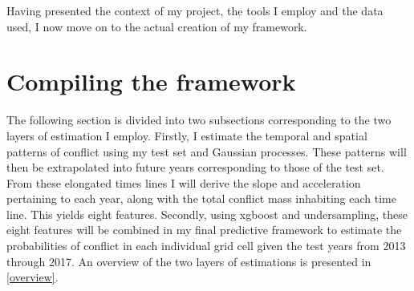 \documentclass[a4paper]{article}
\begin{document}

Having presented the context of my project, the tools I employ and the data used, I now move on to the actual creation of my framework.\par


\section{Compiling the framework}%

The following section is divided into two subsections corresponding to the two layers of estimation I employ. Firstly, I estimate the temporal and spatial patterns of conflict using my test set and Gaussian processes. These patterns will then be extrapolated into future years corresponding to those of the test set. From these elongated times lines I will derive the slope and acceleration pertaining to each year, along with the total conflict mass inhabiting each time line. This yields eight features. Secondly, using xgboost and undersampling, these eight features will be combined in my final predictive framework to estimate the probabilities of conflict in each individual grid cell given the test years from 2013 through 2017. An overview of the two layers of estimations is presented in \autoref{overview}.\par
\end{document}
